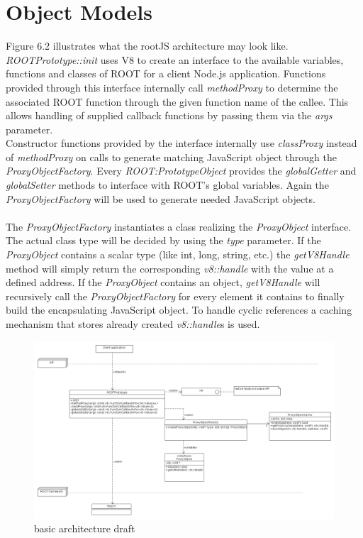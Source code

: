 \pagebreak[4]

\section{Object Models}
Figure 6.2 illustrates what the rootJS architecture may look like.\\
\textit{ROOTPrototype::init} uses V8 to create an interface to the available variables, functions and classes of ROOT for a client Node.js application.
Functions provided through this interface internally call \textit{methodProxy} to determine the associated ROOT function through the given function name of the callee. This allows handling of supplied callback functions by passing them via the \textit{args} parameter.\\
Constructor functions provided by the interface internally use \textit{classProxy} instead of \textit{methodProxy} on calls to generate matching JavaScript object through the \textit{ProxyObjectFactory}.
Every \textit{ROOT:PrototypeObject} provides the \textit{globalGetter} and \textit{globalSetter} methods to interface with ROOT's global variables. Again the \textit{ProxyObjectFactory} will be used to generate needed JavaScript objects.
\\ \\
The \textit{ProxyObjectFactory} instantiates a class realizing the \textit{ProxyObject} interface. The actual class type will be decided by using the \textit{type} parameter.
If the \textit{ProxyObject} contains a scalar type (like int, long, string, etc.) the \textit{getV8Handle} method will simply return the corresponding \textit{v8::handle} with the value at a defined address.
If the \textit{ProxyObject} contains an object, \textit{getV8Handle} will recursively call the \textit{ProxyObjectFactory} for every element it contains to finally build the encapsulating JavaScript object.
To handle cyclic references a caching mechanism that stores already created \textit{v8::handle}s is used.

\begin{figure}[htb]
	\centering
	\includegraphics[width=18cm]{./latex/resources/architecture.png}
	\caption{basic architecture draft}
\end{figure}

